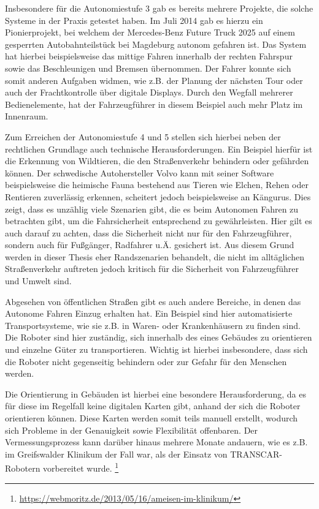 Insbesondere für die Autonomiestufe 3 gab es bereits mehrere Projekte, die solche Systeme in der Praxis getestet haben. Im Juli 2014
gab es hierzu ein Pionierprojekt, bei welchem der Mercedes-Benz Future Truck 2025 auf einem gesperrten Autobahnteilstück bei Magdeburg 
autonom gefahren ist. Das System hat hierbei beispielsweise das mittige Fahren innerhalb der rechten Fahrspur sowie das Beschleunigen
und Bremsen übernommen. Der Fahrer konnte sich somit anderen Aufgaben widmen, wie z.B. der Planung der nächsten Tour oder auch der
Frachtkontrolle über digitale Displays. Durch den Wegfall mehrerer Bedienelemente, hat der Fahrzeugführer in diesem Beispiel auch mehr
Platz im Innenraum. \cite{benz-ft2025}

Zum Erreichen der Autonomiestufe 4 und 5 stellen sich hierbei neben der rechtlichen Grundlage auch technische Herausforderungen.
Ein Beispiel hierfür ist die Erkennung von Wildtieren, die den Straßenverkehr behindern oder gefährden können. Der schwedische
Autohersteller Volvo kann mit seiner Software beispielsweise die heimische Fauna bestehend aus Tieren wie Elchen, Rehen oder Rentieren
zuverlässig erkennen, scheitert jedoch beispielsweise an Kängurus. \cite{volvo-detection-report} 
Dies zeigt, dass es unzählig viele Szenarien gibt, die es beim Autonomen Fahren zu betrachten gibt, um die Fahrsicherheit entsprechend
zu gewährleisten. Hier gilt es auch darauf zu achten, dass die Sicherheit nicht nur für den Fahrzeugführer, sondern auch für Fußgänger, Radfahrer
u.Ä. gesichert ist. Aus diesem Grund werden in dieser Thesis eher Randszenarien behandelt, die nicht im alltäglichen Straßenverkehr auftreten jedoch
kritisch für die Sicherheit von Fahrzeugführer und Umwelt sind.

Abgesehen von öffentlichen Straßen gibt es auch andere Bereiche, in denen das Autonome Fahren Einzug erhalten hat. Ein Beispiel sind hier automatisierte
Transportsysteme, wie sie z.B. in Waren- oder Krankenhäusern zu finden sind. Die Roboter sind hier zuständig, sich innerhalb des eines Gebäudes zu orientieren und
einzelne Güter zu transportieren. Wichtig ist hierbei insbesondere, dass sich die Roboter nicht gegenseitig behindern oder zur Gefahr für den Menschen werden.

Die Orientierung in Gebäuden ist hierbei eine besondere Herausforderung, da es für diese im Regelfall keine digitalen Karten gibt, anhand der sich die Roboter
orientieren können. Diese Karten werden somit teils manuell erstellt, wodurch sich Probleme in der Genauigkeit sowie Flexibilität offenbaren. Der Vermessungsprozess kann darüber
hinaus mehrere Monate andauern, wie es z.B. im Greifswalder Klinikum der Fall war, als der Einsatz von TRANSCAR-Robotern vorbereitet wurde. \footnote{\url{https://webmoritz.de/2013/05/16/ameisen-im-klinikum/}}



